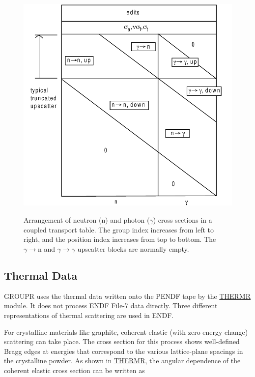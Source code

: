 \begin{figure}[b]\centering
\includegraphics[keepaspectratio, height=4.6in, angle=0]{figs/groupr3}
\caption[Coupled Neutron/Photon Tables]{Arrangement of neutron (n) and
 photon ($\gamma$) cross sections in a coupled transport table.  The group
 index increases from left to right, and the position index increases from top
 to bottom.  The $\gamma{\rightarrow}$n and $\gamma{\rightarrow}\gamma$
 upscatter blocks are normally empty.}
\label{gr3}
\end{figure}

\subsection{Thermal Data}
\label{ssGROUPR_Thermal}

GROUPR uses the thermal data written onto the PENDF tape
by the \hyperlink{sTHERMRhy}{THERMR} module.  It
does not process ENDF File-7
data directly.  Three different representations of thermal scattering
are used in ENDF.

For crystalline materials like graphite, coherent elastic (with zero
energy change) scattering can take place.  The
cross section for this process shows well-defined Bragg
edges at energies that correspond to the
various lattice-plane spacings in the crystalline powder.  As shown
in \hyperlink{sTHERMRhy}{THERMR}, the angular dependence of the
coherent elastic cross section can be written as

